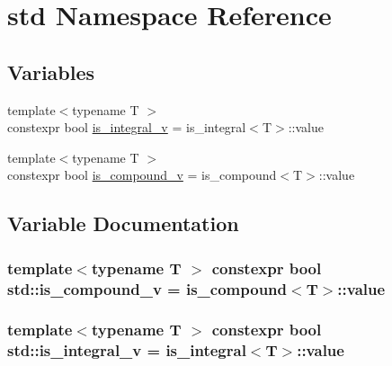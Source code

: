 \hypertarget{namespacestd}{}\section{std Namespace Reference}
\label{namespacestd}
\subsection*{Variables}
\begin{DoxyCompactItemize}
\item 
{\footnotesize template$<$typename T $>$ }\\constexpr bool \hyperlink{namespacestd_a824c5eb1a7e8aafa382dc9af3329a9e8}{is\+\_\+integral\+\_\+v} = is\+\_\+integral$<$T$>$\+::value
\item 
{\footnotesize template$<$typename T $>$ }\\constexpr bool \hyperlink{namespacestd_ae1e905cdb2694181466fae8f8dd8f8e8}{is\+\_\+compound\+\_\+v} = is\+\_\+compound$<$T$>$\+::value
\end{DoxyCompactItemize}


\subsection{Variable Documentation}
\subsubsection[{\texorpdfstring{is\+\_\+compound\+\_\+v}{is_compound_v}}]{\setlength{\rightskip}{0pt plus 5cm}template$<$typename T $>$ constexpr bool std\+::is\+\_\+compound\+\_\+v = is\+\_\+compound$<$T$>$\+::value}\hypertarget{namespacestd_ae1e905cdb2694181466fae8f8dd8f8e8}{}\label{namespacestd_ae1e905cdb2694181466fae8f8dd8f8e8}
\subsubsection[{\texorpdfstring{is\+\_\+integral\+\_\+v}{is_integral_v}}]{\setlength{\rightskip}{0pt plus 5cm}template$<$typename T $>$ constexpr bool std\+::is\+\_\+integral\+\_\+v = is\+\_\+integral$<$T$>$\+::value}\hypertarget{namespacestd_a824c5eb1a7e8aafa382dc9af3329a9e8}{}\label{namespacestd_a824c5eb1a7e8aafa382dc9af3329a9e8}
